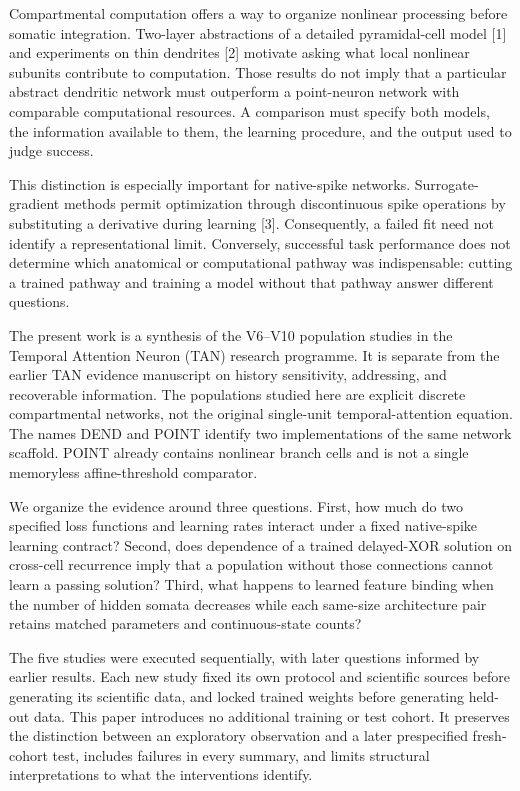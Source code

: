 \documentclass[
  10pt,
]{article}
\begin{document}
Compartmental computation offers a way to organize nonlinear processing
before somatic integration. Two-layer abstractions of a detailed
pyramidal-cell model {[}1{]} and experiments on thin dendrites {[}2{]}
motivate asking what local nonlinear subunits contribute to computation.
Those results do not imply that a particular abstract dendritic network
must outperform a point-neuron network with comparable computational
resources. A comparison must specify both models, the information
available to them, the learning procedure, and the output used to judge
success.

This distinction is especially important for native-spike networks.
Surrogate-gradient methods permit optimization through discontinuous
spike operations by substituting a derivative during learning {[}3{]}.
Consequently, a failed fit need not identify a representational limit.
Conversely, successful task performance does not determine which
anatomical or computational pathway was indispensable: cutting a trained
pathway and training a model without that pathway answer different
questions.

The present work is a synthesis of the V6--V10 population studies in the
Temporal Attention Neuron (TAN) research programme. It is separate from
the earlier TAN evidence manuscript on history sensitivity, addressing,
and recoverable information. The populations studied here are explicit
discrete compartmental networks, not the original single-unit
temporal-attention equation. The names DEND and POINT identify two
implementations of the same network scaffold. POINT already contains
nonlinear branch cells and is not a single memoryless affine-threshold
comparator.

We organize the evidence around three questions. First, how much do two
specified loss functions and learning rates interact under a fixed
native-spike learning contract? Second, does dependence of a trained
delayed-XOR solution on cross-cell recurrence imply that a population
without those connections cannot learn a passing solution? Third, what
happens to learned feature binding when the number of hidden somata
decreases while each same-size architecture pair retains matched
parameters and continuous-state counts?

The five studies were executed sequentially, with later questions
informed by earlier results. Each new study fixed its own protocol and
scientific sources before generating its scientific data, and locked
trained weights before generating held-out data. This paper introduces
no additional training or test cohort. It preserves the distinction
between an exploratory observation and a later prespecified fresh-cohort
test, includes failures in every summary, and limits structural
interpretations to what the interventions identify.
\end{document}
